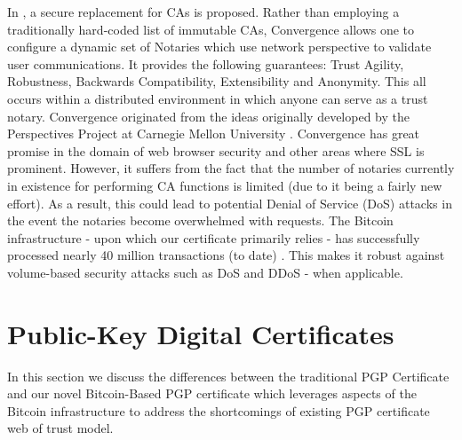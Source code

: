 \documentclass{llncs}
\begin{document}
\indent In \cite{convergence}, a secure replacement for CAs is proposed.  Rather than employing a traditionally hard-coded list of immutable CAs, Convergence allows one to configure a dynamic set of Notaries which use network perspective to validate user communications.  It provides the following guarantees: Trust Agility, Robustness, Backwards Compatibility, Extensibility and Anonymity.  This all occurs within a distributed environment in which anyone can serve as a trust notary. Convergence originated from the ideas originally developed by the Perspectives Project at Carnegie Mellon University \cite{perspectives}.  Convergence has great promise in the domain of web browser security and other areas where SSL is prominent.  However, it suffers from the fact that the number of notaries currently in existence for performing CA functions is limited (due to it being a fairly new effort).  As a result, this could lead to potential Denial of Service (DoS) attacks in the event the notaries become overwhelmed with requests.  The Bitcoin infrastructure - upon which our certificate primarily relies - has successfully processed nearly 40 million transactions (to date) \cite{stats}.  This makes it robust against volume-based security attacks such as DoS and DDoS - when applicable.   

\section{Public-Key Digital Certificates}
In this section we discuss the differences between the traditional PGP Certificate and our novel Bitcoin-Based PGP certificate which leverages aspects of the Bitcoin infrastructure to address the shortcomings of existing PGP certificate web of trust model. 
\end{document}
